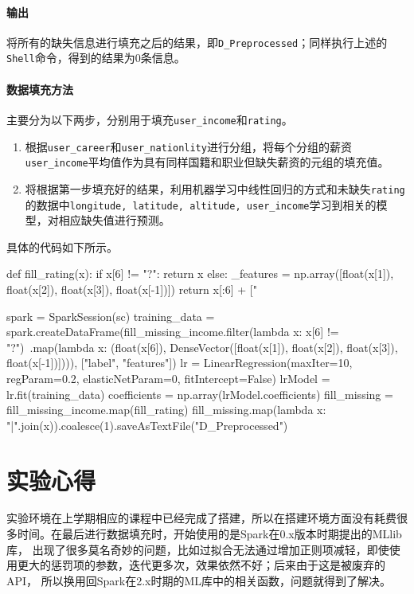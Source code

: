 \documentclass{ML}
\begin{document}
\paragraph{输出} 将所有的缺失信息进行填充之后的结果，即\texttt{D\_Preprocessed}；同样执行上述的\texttt{Shell}命令，得到的结果为$0$条信息。
\paragraph{数据填充方法} 主要分为以下两步，分别用于填充\texttt{user\_income}和\texttt{rating}。
\begin{enumerate}
    \item 根据\texttt{user\_career}和\texttt{user\_nationlity}进行分组，将每个分组的薪资\texttt{user\_income}平均值作为具有同样国籍和职业但缺失薪资的元组的填充值。
    \item 将根据第一步填充好的结果，利用机器学习中线性回归的方式和未缺失\texttt{rating}的数据中\texttt{longitude, latitude, altitude, user\_income}学习到相关的模型，对相应缺失值进行预测。
\end{enumerate}
具体的代码如下所示。
\begin{pythoncode}
def fill_rating(x):
    if x[6] != "?":
        return x
    else:
        _features = np.array([float(x[1]), float(x[2]), float(x[3]), float(x[-1])])
        return x[:6] + ["%

spark = SparkSession(sc)
training_data = spark.createDataFrame(fill_missing_income.filter(lambda x: x[6] != "?")\
                .map(lambda x: (float(x[6]), DenseVector([float(x[1]), float(x[2]), 
                float(x[3]), float(x[-1])]))), ["label", "features"])
lr = LinearRegression(maxIter=10, regParam=0.2, elasticNetParam=0, fitIntercept=False)
lrModel = lr.fit(training_data)
coefficients = np.array(lrModel.coefficients)
fill_missing = fill_missing_income.map(fill_rating)
fill_missing.map(lambda x: "|".join(x)).coalesce(1).saveAsTextFile("D_Preprocessed")
\end{pythoncode}
\section{实验心得}
实验环境在上学期相应的课程中已经完成了搭建，所以在搭建环境方面没有耗费很多时间。在最后进行数据填充时，开始使用的是Spark在0.x版本时期提出的MLlib库，
出现了很多莫名奇妙的问题，比如过拟合无法通过增加正则项减轻，即使使用更大的惩罚项的参数，迭代更多次，效果依然不好；后来由于这是被废弃的API，
所以换用回Spark在2.x时期的ML库中的相关函数，问题就得到了解决。

\end{document}
